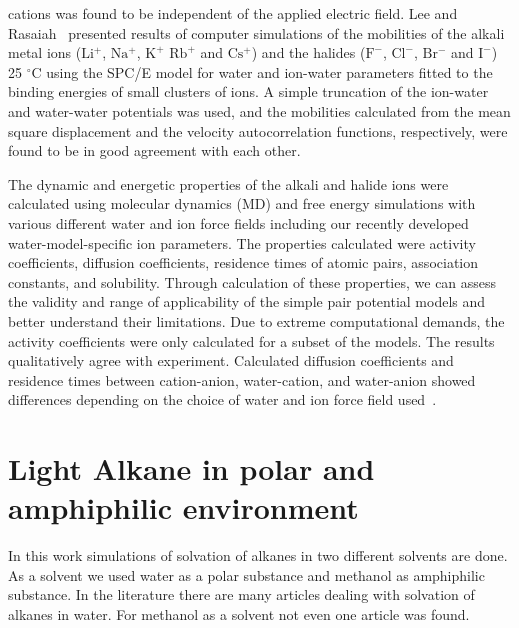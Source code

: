 cations was found to be independent of the applied electric field. Lee and   Rasaiah~ \citep{lee1996molecular}  presented results of computer simulations of the mobilities of the alkali metal ions ($\mathrm{Li^{+}}$, $\mathrm{Na^{+}}$, $\mathrm{K^{+}}$ $\mathrm{Rb^{+}}$ and $\mathrm{Cs^{+}}$) and the halides ($\mathrm{F^{-}}$, $\mathrm{Cl^{-}}$, $\mathrm{Br^{-}}$ and  $\mathrm{I^{-}}$) 25 $^{\circ}$C using the SPC/E model for water and ion-water parameters fitted to the binding energies of small clusters of ions. A simple truncation of the ion-water and water-water potentials was used, and the mobilities calculated from the mean square displacement and the velocity autocorrelation functions, respectively, were found to be in good agreement with each other. 
 
 \begin{sloppypar}
 The dynamic and energetic properties of the alkali and halide ions were calculated using molecular dynamics (MD) and free energy simulations with various different water and ion force fields including our recently developed water-model-specific ion parameters. The properties calculated were activity coefficients, diffusion coefficients, residence times of atomic pairs, association constants, and solubility. Through calculation of these properties, we can assess the validity and range of applicability of the simple pair potential models and better understand their limitations. Due to extreme computational demands, the activity coefficients were only calculated for a subset of the models. The results qualitatively agree with experiment. Calculated diffusion coefficients and residence times between cation-anion, water-cation, and water-anion showed differences depending on the choice of water and ion force field used~\citep{joung2009molecular}.
\end{sloppypar}

\section{ Light Alkane in  polar and amphiphilic environment}
In this work simulations of solvation of alkanes in two different solvents are done. As a solvent
we used water as a polar substance and methanol as amphiphilic substance. In the literature
there are  many articles dealing with  solvation of alkanes in water. For methanol as a solvent not even one article was found. 

